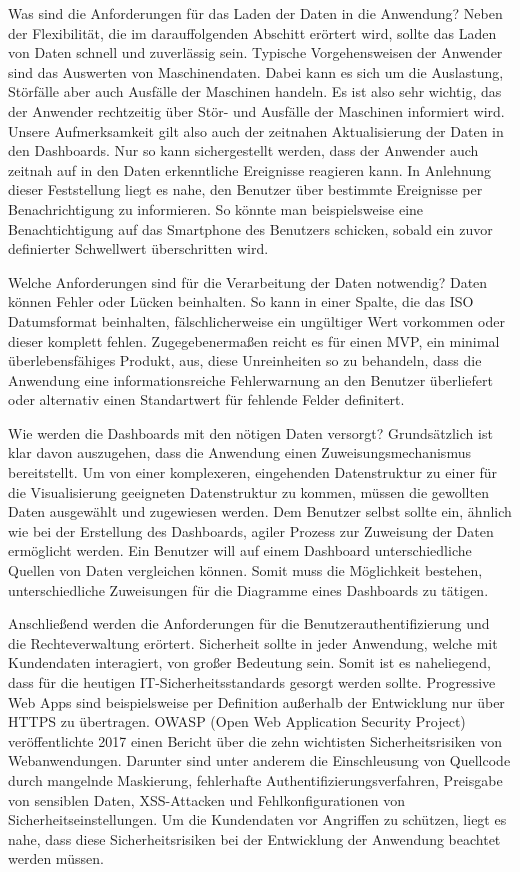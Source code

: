 Was sind die Anforderungen für das Laden der Daten in die Anwendung? Neben der Flexibilität,
die im darauffolgenden Abschitt erörtert wird, sollte das Laden von Daten schnell und zuverlässig
sein. Typische Vorgehensweisen der Anwender sind das Auswerten von Maschinendaten. Dabei kann es
sich um die Auslastung, Störfälle aber auch Ausfälle der Maschinen handeln. Es ist also sehr wichtig,
das der Anwender rechtzeitig über Stör- und Ausfälle der Maschinen informiert wird. Unsere
Aufmerksamkeit gilt also auch der zeitnahen Aktualisierung der Daten in den Dashboards. Nur
so kann sichergestellt werden, dass der Anwender auch zeitnah auf in den Daten erkenntliche
Ereignisse reagieren kann. In Anlehnung dieser Feststellung liegt es nahe, den Benutzer
über bestimmte Ereignisse per Benachrichtigung zu informieren. So könnte man beispielsweise
eine Benachtichtigung auf das Smartphone des Benutzers schicken, sobald ein zuvor definierter
Schwellwert überschritten wird.

Welche Anforderungen sind für die Verarbeitung der Daten notwendig? Daten können Fehler oder Lücken
beinhalten. So kann in einer Spalte, die das ISO Datumsformat beinhalten, fälschlicherweise ein
ungültiger Wert vorkommen oder dieser komplett fehlen. Zugegebenermaßen reicht es für einen MVP, ein
minimal überlebensfähiges Produkt, aus, diese Unreinheiten so zu behandeln, dass die Anwendung
eine informationsreiche Fehlerwarnung an den Benutzer überliefert oder alternativ einen Standartwert
für fehlende Felder definitert.

Wie werden die Dashboards mit den nötigen Daten versorgt? Grundsätzlich ist klar davon auszugehen,
dass die Anwendung einen Zuweisungsmechanismus bereitstellt. Um von einer komplexeren, eingehenden
Datenstruktur zu einer für die Visualisierung geeigneten Datenstruktur zu kommen, müssen die gewollten
Daten ausgewählt und zugewiesen werden. Dem Benutzer selbst sollte ein, ähnlich wie bei der Erstellung
des Dashboards, agiler Prozess zur Zuweisung der Daten ermöglicht werden. Ein Benutzer will auf einem
Dashboard unterschiedliche Quellen von Daten vergleichen können. Somit muss die Möglichkeit bestehen,
unterschiedliche Zuweisungen für die Diagramme eines Dashboards zu tätigen.

Anschließend werden die Anforderungen für die Benutzerauthentifizierung und die Rechteverwaltung erörtert.
Sicherheit sollte in jeder Anwendung, welche mit Kundendaten interagiert, von großer Bedeutung sein.
Somit ist es naheliegend, dass für die heutigen IT-Sicherheitsstandards gesorgt werden sollte. Progressive
Web Apps sind beispielsweise per Definition außerhalb der Entwicklung nur über HTTPS zu übertragen.\cite[S. 16]{KevinFrankPWAMasterarbeit}
OWASP (Open Web Application Security Project) veröffentlichte 2017 einen Bericht über die zehn
wichtisten Sicherheitsrisiken von Webanwendungen. Darunter sind unter anderem die Einschleusung
von Quellcode durch mangelnde Maskierung, fehlerhafte Authentifizierungsverfahren, Preisgabe von sensiblen Daten,
XSS-Attacken und Fehlkonfigurationen von Sicherheitseinstellungen.\cite[S. 4]{OWASPTopTen}
Um die Kundendaten vor Angriffen zu schützen, liegt es nahe, dass diese Sicherheitsrisiken bei der
Entwicklung der Anwendung beachtet werden müssen. 

